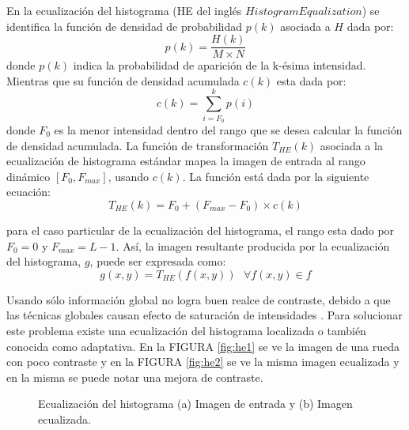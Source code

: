 En la ecualización del histograma (HE del inglés $Histogram Equalization$) se identifica la función de densidad de probabilidad $p(k)$ asociada a $H$ dada por:
\begin{equation}
\label{eq:funDenProbAsociada}
p(k)=\frac{H(k)}{M\times N}
\end{equation}
donde $p(k)$ indica la probabilidad de aparición de la k-ésima intensidad. Mientras que su función de densidad acumulada
$c(k)$ esta dada por:
%
\begin{equation}
\label{eq:FunDenAcumulada}
c(k)=\sum_{i=F_{0}}^{k}p(i)
\end{equation}
%
donde $F_{0}$ es la menor intensidad dentro del rango que se desea calcular la función de densidad acumulada.
La función de transformación $T_{HE}(k)$ asociada a la ecualización de histograma estándar mapea la imagen de entrada al rango dinámico $[F_{0},F_{max}]$, usando $c(k)$. La función está dada por la siguiente ecuación:
\begin{equation}
\label{eq:histo_4}
T_{HE}(k)=F_{0}+(F_{max}-F_{0})\times c(k)
\end{equation}

%
para el caso particular de la ecualización del histograma, el rango esta dado por $F_{0}=0$ y $F_{max}=L-1$. Así, la imagen resultante producida por la
ecualización del histograma, $g$, puede ser expresada como:
\begin{equation}
\label{eq:histo_5}
 g(x, y) = T_{HE} (f(x, y)) \text{  }  \forall  f(x, y) \in  f
\end{equation}

Usando sólo información  global no logra buen realce de contraste, debido a 
que las técnicas globales causan efecto de saturación de intensidades \cite{wang2007fast}. Para solucionar este problema existe una ecualización del histograma localizada o también conocida como adaptativa.
 En la FIGURA \ref{fig:he1} se ve la imagen de una rueda con poco contraste y en la FIGURA \ref{fig:he2} se ve la misma imagen ecualizada y en la misma se puede notar una mejora de contraste. 
\begin{figure}[H]
	\centering
	\caption{Ecualización del histograma (a) Imagen de entrada y (b) Imagen ecualizada.}
	\label{fig:he}
\end{figure}


